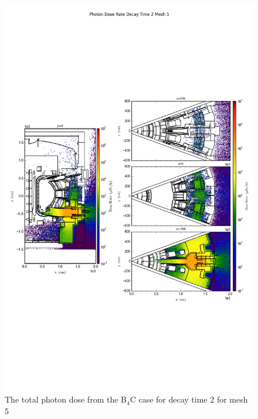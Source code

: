 \documentclass[12pt]{article}
\begin{document}
\begin{figure}[ht!]
\centering
\includegraphics[trim={0cm 9cm 0cm 10cm},clip,scale=0.75]{../plots/final_model/Photon_Dose_Rate_Decay_Time_2_Mesh_5.png}
\caption{The total photon dose from the B$_4$C case for decay time 2 for mesh 5}
\label{fig:ct_photons_dc2_no4bc_m5_flux}
\end{figure}
\newpage
\clearpage
\end{document}
